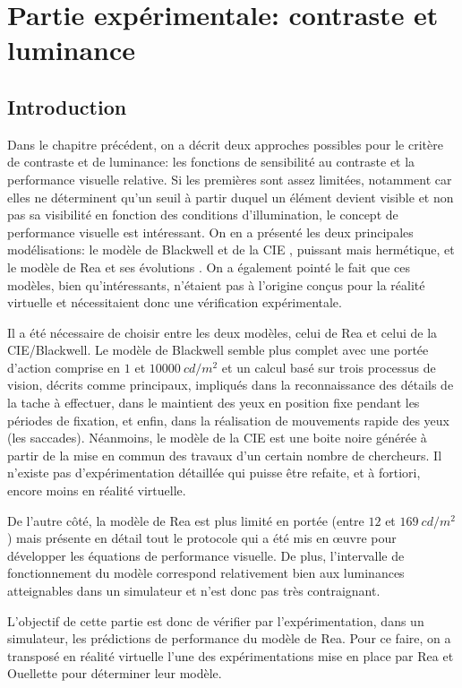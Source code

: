 \part{Partie expérimentale: contraste et luminance}

\chapter*{Introduction}
\par Dans le chapitre précédent, on a décrit deux approches possibles pour le critère de contraste et de luminance: les fonctions de sensibilité au contraste et la performance visuelle relative. Si les premières sont assez limitées, notamment car elles ne déterminent qu'un seuil à partir duquel un élément devient visible et non pas sa visibilité en fonction des conditions d'illumination, le concept de performance visuelle est intéressant. On en a présenté les deux principales modélisations: le modèle de Blackwell et de la CIE \citep{blackwell_ieri:_1971}, puissant mais hermétique, et le modèle de Rea et ses évolutions \citep{rea_toward_1986}. On a également pointé le fait que ces modèles, bien qu'intéressants, n'étaient pas à l'origine conçus pour la réalité virtuelle et nécessitaient donc une vérification expérimentale.

\par Il a été nécessaire de choisir entre les deux modèles, celui de Rea et celui de la CIE/Blackwell. Le modèle de Blackwell semble plus complet avec une portée d'action comprise en $1$ et $10000~cd/m^2$ et un calcul basé sur trois processus de vision, décrits comme principaux, impliqués dans la reconnaissance des détails de la tache à effectuer, dans le maintient des yeux en position fixe pendant les périodes de fixation, et enfin, dans la réalisation de mouvements rapide des yeux (les saccades). Néanmoins, le modèle de la CIE est une boite noire générée à partir de la mise en commun des travaux d'un certain nombre de chercheurs. Il n'existe pas d'expérimentation détaillée qui puisse être refaite, et à fortiori, encore moins en réalité virtuelle.

\par De l'autre côté, la modèle de Rea est plus limité en portée (entre $12$ et $169~cd/m^2$) mais présente en détail tout le protocole qui a été mis en œuvre pour développer les équations de performance visuelle. De plus, l'intervalle de fonctionnement du modèle correspond relativement bien aux luminances atteignables dans un simulateur et n'est donc pas très contraignant.

\par L'objectif de cette partie est donc de vérifier par l'expérimentation, dans un simulateur, les prédictions de performance du modèle de Rea. Pour ce faire, on a transposé en réalité virtuelle l'une des expérimentations mise en place par Rea et Ouellette pour déterminer leur modèle.